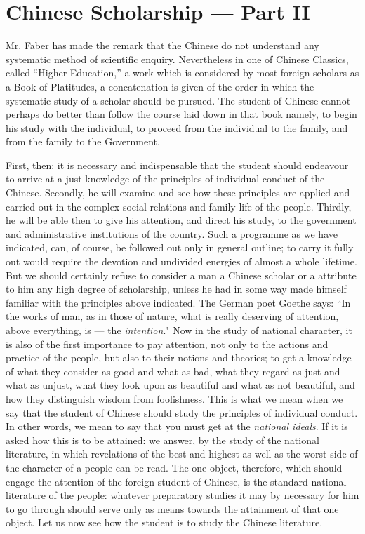 \chapter{Chinese Scholarship --- Part II}
Mr. Faber has made the remark that the Chinese do not understand any systematic method of scientific enquiry.
Nevertheless in one of Chinese Classics, called ``Higher Education,''\cite{num26} a work which is considered by most foreign scholars as a Book of Platitudes, a concatenation is given of the order in which the systematic study of a scholar should be pursued.
The student of Chinese cannot perhaps do better than follow the course laid down in that book namely, to begin his study  with the individual, to proceed from the individual to the family, and from the family to the Government.

First, then: it is necessary and indispensable that the student should endeavour to arrive at a just knowledge of the principles of individual conduct of the Chinese.
Secondly, he will examine and see how these principles are applied and carried out in the complex social relations and family life of the people.
Thirdly, he will be able then to give his attention, and direct his study, to the government and administrative institutions of the country.
Such a programme as we have indicated, can, of course, be followed out only in general outline; to carry it fully out would require the devotion and undivided energies of almost a whole lifetime.
But we should certainly refuse to consider a man a Chinese scholar or a attribute to him any high degree of scholarship, unless he had in some way made himself familiar with the principles above indicated.
The German poet Goethe says: ``In the works of man, as in those of nature, what is really deserving of attention, above everything, is --- the \emph{intention}."
Now in the study of national character, it is also of the first importance to pay attention, not only to the actions and practice of the people, but also to their notions and theories; to get a knowledge of what they consider as good and what as bad, what they regard as just and what as unjust, what they look upon as beautiful and what as not beautiful, and how they distinguish wisdom from foolishness.
This is what we mean when we say that the student of Chinese should study the principles of individual conduct.
In other words, we mean to say that you must get at the \emph{national ideals}.
If it is asked how this is to be attained: we answer, by the study of the national literature, in which revelations of the best and highest as well as the worst side of the character of a people can be read.
The one object, therefore, which should engage the attention of the foreign student of Chinese, is the standard national literature of the people: whatever preparatory studies it may by necessary for him to go through should serve only as means towards the attainment of that one object.
Let us now see how the student is to study the Chinese literature.

